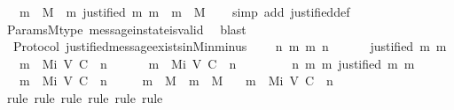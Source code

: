 \begin{isabellebody}
\ \ {\isachardoublequoteopen}{\isasymforall}\ m\ {\isasymin}\ M{\isachardot}\ {\isasymforall}\ m{\isacharprime}{\isachardot}\ justified\ m{\isacharprime}\ m\ {\isasymlongrightarrow}\ m{\isacharprime}\ {\isasymin}\ M{\isachardoublequoteclose}\isanewline
%
\isadelimproof
\ \ %
\endisadelimproof
%
\isatagproof
{}\isamarkupfalse%
\ {\isacharparenleft}simp\ add{\isacharcolon}\ justified{\isacharunderscore}def{\isacharparenright}\isanewline
\ \ \isamarkupfalse%
\ Params{\isachardot}M{\isacharunderscore}type\ message{\isacharunderscore}in{\isacharunderscore}state{\isacharunderscore}is{\isacharunderscore}valid\ \isamarkupfalse%
\ blast%
\endisatagproof
{\isafoldproof}%
%
\isadelimproof
\isanewline
%
\endisadelimproof
\isanewline
{}\isamarkupfalse%
\ {\isacharparenleft}\ Protocol{\isacharparenright}\ justified{\isacharunderscore}message{\isacharunderscore}exists{\isacharunderscore}in{\isacharunderscore}Mi{\isacharunderscore}n{\isacharunderscore}minus{\isacharunderscore}{}\ {\isacharcolon}\isanewline
\ \ {\isachardoublequoteopen}{\isasymforall}\ n\ m\ m{\isacharprime}{\isachardot}\ n\ {\isasymin}\ {\isasymnat}\ \isanewline
\ \ {\isasymlongrightarrow}\ justified\ m{\isacharprime}\ m\isanewline
\ \ {\isasymlongrightarrow}\ m\ {\isasymin}\ Mi\ {\isacharparenleft}V{\isacharcomma}\ C{\isacharcomma}\ {\isasymepsilon}{\isacharparenright}\ n\ \ \isanewline
\ \ {\isasymlongrightarrow}\ \ m{\isacharprime}\ {\isasymin}\ Mi\ {\isacharparenleft}V{\isacharcomma}\ C{\isacharcomma}\ {\isasymepsilon}{\isacharparenright}\ {\isacharparenleft}n\ {\isacharminus}\ {}{\isacharparenright}{\isachardoublequoteclose}\isanewline
%
\isadelimproof
%
\endisadelimproof
%
\isatagproof
{}\isamarkupfalse%
\ {\isacharminus}\isanewline
\ \ \isamarkupfalse%
\ {\isachardoublequoteopen}{\isasymforall}\ n\ m\ m{\isacharprime}{\isachardot}\ justified\ m{\isacharprime}\ m\isanewline
\ \ {\isasymlongrightarrow}\ m\ {\isasymin}\ Mi\ {\isacharparenleft}V{\isacharcomma}\ C{\isacharcomma}\ {\isasymepsilon}{\isacharparenright}\ n\ \ \isanewline
\ \ {\isasymlongrightarrow}\ m\ {\isasymin}\ M\ {\isasymand}\ m{\isacharprime}\ {\isasymin}\ M\isanewline
\ \ {\isasymlongrightarrow}\ m{\isacharprime}\ {\isasymin}\ Mi\ {\isacharparenleft}V{\isacharcomma}\ C{\isacharcomma}\ {\isasymepsilon}{\isacharparenright}\ {\isacharparenleft}n\ {\isacharminus}\ {}{\isacharparenright}{\isachardoublequoteclose}\isanewline
\ \ \ \ \isamarkupfalse%
\ {\isacharparenleft}rule{\isacharcomma}\ rule{\isacharcomma}\ rule{\isacharcomma}\ rule{\isacharcomma}\ rule{\isacharcomma}\ rule{\isacharparenright}\isanewline

\end{isabellebody}
